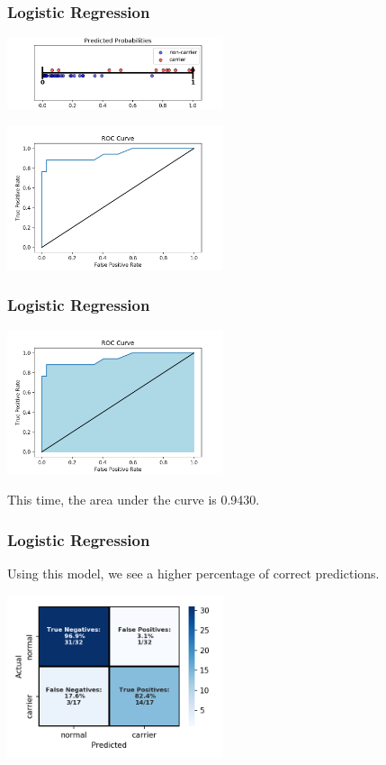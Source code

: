 \documentclass[11pt, table]{beamer}
\begin{document}
\begin{frame}
\frametitle{Logistic Regression}
\begin{center}
	\includegraphics[width=2.5in]{images/Dystrophy/pred_proba_02.png}
\end{center}

\begin{center}
	\includegraphics[width=2.5in]{images/Dystrophy/roc_03.png}
\end{center}
\end{frame}

\begin{frame}
\frametitle{Logistic Regression}
\begin{center}
	\includegraphics[width=2.5in]{images/Dystrophy/roc_04.png}
\end{center}

This time, the area under the curve is 0.9430.
\end{frame}

\begin{frame}
\frametitle{Logistic Regression}
Using this model, we see a higher percentage of correct predictions.

\begin{center}
	\includegraphics[width=2.5in]{images/Dystrophy/cm_2.png}
\end{center}

\end{frame}
\end{document}

